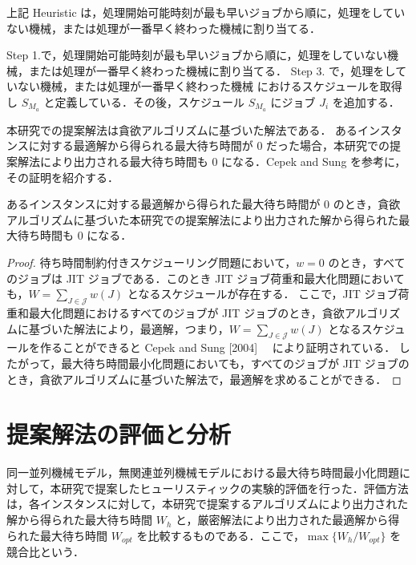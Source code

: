 \documentclass[12pt]{optlab-bachelor}
\begin{document}
上記 {\sc Heuristic} は，処理開始可能時刻が最も早いジョブから順に，処理をしていない機械，または処理が一番早く終わった機械に割り当てる．

Step 1.で，処理開始可能時刻が最も早いジョブから順に，処理をしていない機械，または処理が一番早く終わった機械に割り当てる．
Step 3. で，処理をしていない機械，または処理が一番早く終わった機械 におけるスケジュールを取得し $S_{M_a}$ と定義している．その後，スケジュール $S_{M_a}$ にジョブ $J_i$ を追加する．

本研究での提案解法は貪欲アルゴリズムに基づいた解法である．
あるインスタンスに対する最適解から得られる最大待ち時間が 0 だった場合，本研究での提案解法により出力される最大待ち時間も 0 になる．Cepek and Sung \cite{JIT} を参考に，その証明を紹介する．

\begin{lemma}
  あるインスタンスに対する最適解から得られた最大待ち時間が $0$ のとき，貪欲アルゴリズムに基づいた本研究での提案解法により出力された解から得られた最大待ち時間も $0$ になる．
\end{lemma}

\begin{proof}
  待ち時間制約付きスケジューリング問題において，$w = 0$ のとき，すべてのジョブは JIT ジョブである．このとき JIT ジョブ荷重和最大化問題においても，$W = {\displaystyle \sum_{J \in \mathcal{J}}w(J)}$ となるスケジュールが存在する．
  ここで，JIT ジョブ荷重和最大化問題におけるすべてのジョブが JIT ジョブのとき，貪欲アルゴリズムに基づいた解法により，最適解，つまり，$W = {\displaystyle \sum_{J \in \mathcal{J}}w(J)}$ となるスケジュールを作ることができると Cepek and Sung [2004] \cite{JIT}　により証明されている．
  したがって，最大待ち時間最小化問題においても，すべてのジョブが JIT ジョブのとき，貪欲アルゴリズムに基づいた解法で，最適解を求めることができる．
\end{proof}

\section{提案解法の評価と分析}\label{5_s_3}
同一並列機械モデル，無関連並列機械モデルにおける最大待ち時間最小化問題に対して，本研究で提案したヒューリスティックの実験的評価を行った．評価方法は，各インスタンスに対して，本研究で提案するアルゴリズムにより出力された解から得られた最大待ち時間 $W_h$ と，厳密解法により出力された最適解から得られた最大待ち時間 $W_{opt}$ を比較するものである．ここで，$\max\{W_h/W_{opt}\}$ を競合比という．
\end{document}
